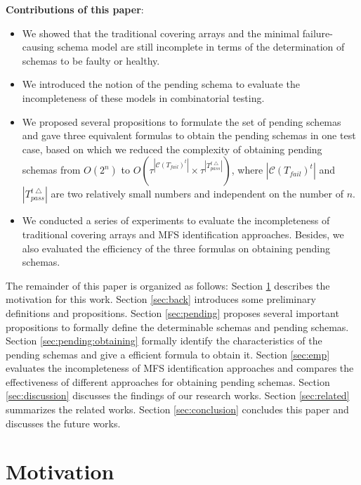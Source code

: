 \textbf{Contributions of this paper}:
\begin{itemize}

  \item We showed that the traditional covering arrays and the minimal failure-causing schema model are still incomplete in terms of the determination of schemas to be faulty or healthy.
  \item We introduced the notion of the pending schema to evaluate the incompleteness of these models in combinatorial testing.
  \item We proposed several propositions to formulate the set of pending schemas and gave three equivalent formulas to obtain the pending schemas in one test case, based on which we reduced the complexity of obtaining pending schemas from $O(2^{n})$ to $O(\tau^{|\mathcal{C}(T_{fail})^{t}|} \times \tau^{|T_{pass}^{t\bigtriangleup}|})$, where $|\mathcal{C}(T_{fail})^{t}|$ and $|T_{pass}^{t\bigtriangleup}|$ are two relatively small numbers and independent on the number of $n$.
  \item We conducted a series of experiments to evaluate the incompleteness of traditional covering arrays and MFS identification approaches. Besides, we also evaluated the efficiency of the three formulas on obtaining pending schemas.
\end{itemize}

The remainder of this paper is organized as follows: Section \ref{sec:motiv} describes the motivation for this work. Section \ref{sec:back} introduces some preliminary definitions and propositions. Section \ref{sec:pending} proposes several important propositions to formally define the determinable schemas and pending schemas. Section \ref{sec:pending:obtaining} formally identify the characteristics of the pending schemas and give a efficient formula to obtain it. Section \ref{sec:emp} evaluates the incompleteness of MFS identification approaches and compares the effectiveness of different approaches for obtaining pending schemas. Section \ref{sec:discussion} discusses the findings of our research works.  Section \ref{sec:related} summarizes the related works. Section \ref{sec:conclusion} concludes this paper and discusses the future works.


\section{Motivation}\label{sec:motiv}

